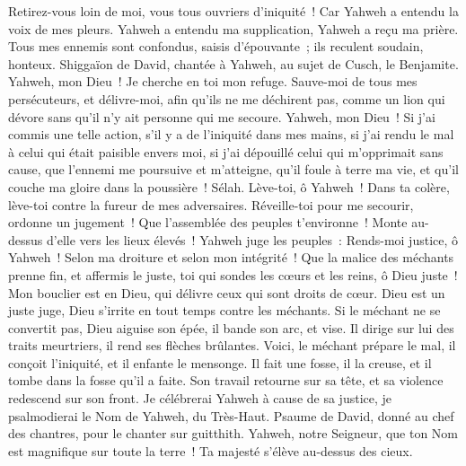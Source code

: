 \begin{multicols}{2}
Retirez-vous loin de moi, vous tous ouvriers d'iniquité~! Car Yahweh a entendu la voix de mes pleurs.
Yahweh a entendu ma supplication, Yahweh a reçu ma prière.
Tous mes ennemis sont confondus, saisis d'épouvante~; ils reculent soudain, honteux.
\VerseOne{}Shiggaïon de David, chantée à Yahweh, au sujet de Cusch, le Benjamite.
Yahweh, mon Dieu~! Je cherche en toi mon refuge. Sauve-moi de tous mes persécuteurs, et délivre-moi,
afin qu'ils ne me déchirent pas, comme un lion qui dévore sans qu'il n'y ait personne qui me secoure.
Yahweh, mon Dieu~! Si j'ai commis une telle action, s'il y a de l'iniquité dans mes mains,
si j'ai rendu le mal à celui qui était paisible envers moi, si j'ai dépouillé celui qui m'opprimait sans cause,
que l'ennemi me poursuive et m'atteigne, qu'il foule à terre ma vie, et qu'il couche ma gloire dans la poussière~! Sélah.
Lève-toi, ô Yahweh~! Dans ta colère, lève-toi contre la fureur de mes adversaires. Réveille-toi pour me secourir, ordonne un jugement~!
Que l'assemblée des peuples t'environne~! Monte au-dessus d'elle vers les lieux élevés~!
Yahweh juge les peuples~: Rends-moi justice, ô Yahweh~! Selon ma droiture et selon mon intégrité~!
Que la malice des méchants prenne fin, et affermis le juste, toi qui sondes les cœurs et les reins, ô Dieu juste~!
Mon bouclier est en Dieu, qui délivre ceux qui sont droits de cœur.
Dieu est un juste juge, Dieu s'irrite en tout temps contre les méchants.
Si le méchant ne se convertit pas, Dieu aiguise son épée, il bande son arc, et vise.
Il dirige sur lui des traits meurtriers, il rend ses flèches brûlantes.
Voici, le méchant prépare le mal, il conçoit l'iniquité, et il enfante le mensonge.
Il fait une fosse, il la creuse, et il tombe dans la fosse qu'il a faite.
Son travail retourne sur sa tête, et sa violence redescend sur son front.
Je célébrerai Yahweh à cause de sa justice, je psalmodierai le Nom de Yahweh, du Très-Haut.
\VerseOne{}Psaume de David, donné au chef des chantres, pour le chanter sur guitthith.
Yahweh, notre Seigneur, que ton Nom est magnifique sur toute la terre~! Ta majesté s'élève au-dessus des cieux.

\end{multicols}
